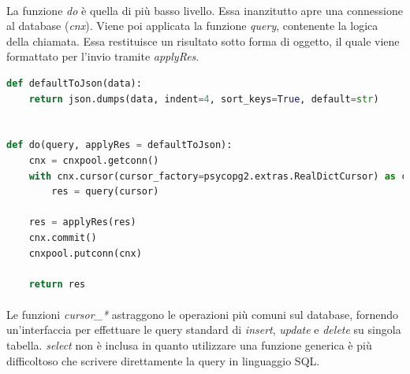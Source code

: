 \documentclass[12pt,a4paper,twoside,english,italian]{book}
\begin{document}
\paragraph{} La funzione \emph{do} è quella di più basso livello. Essa inanzitutto apre una connessione al database (\emph{cnx}). Viene poi applicata la funzione \emph{query}, contenente la logica della chiamata. Essa restituisce un risultato sotto forma di oggetto, il quale viene formattato per l'invio tramite \emph{applyRes}.  

\begin{lstlisting}[language=python, caption=Funzione \emph{do}]
def defaultToJson(data):
    return json.dumps(data, indent=4, sort_keys=True, default=str)


def do(query, applyRes = defaultToJson):
    cnx = cnxpool.getconn()
    with cnx.cursor(cursor_factory=psycopg2.extras.RealDictCursor) as cursor:
        res = query(cursor)

    res = applyRes(res)
    cnx.commit()
    cnxpool.putconn(cnx)

    return res
\end{lstlisting}

\paragraph{} Le funzioni \emph{cursor\_*} astraggono le operazioni più comuni sul database, fornendo un'interfaccia per effettuare le query standard di \emph{insert}, \emph{update} e \emph{delete} su singola tabella. \emph{select} non è inclusa in quanto utilizzare una funzione generica è più difficoltoso che scrivere direttamente la query in linguaggio SQL. 
\end{document}

